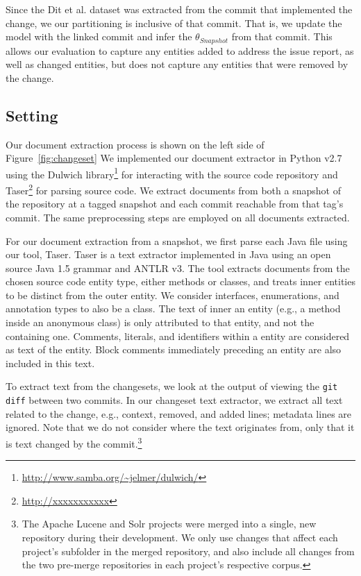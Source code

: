 Since the Dit et al. dataset was extracted from the commit that implemented the change,
we our partitioning is inclusive of that commit.
That is, we update the model with the linked commit and infer the
$\theta_{Snapshot}$ from that commit.
This allows our evaluation to capture any entities added to address the issue report,
as well as changed entities,
but does not capture any entities that were removed by the change.





\subsection{Setting}

Our document extraction process is shown on the left side of Figure~\ref{fig:changeset}
We implemented our document extractor in Python v2.7
using the Dulwich library\footnote{\url{http://www.samba.org/~jelmer/dulwich/}}
for interacting with the source code repository and
Taser\footnote{\url{http://xxxxxxxxxxx}} for parsing source code.
We extract documents from both a snapshot of the repository at a tagged
snapshot and each commit reachable from that tag's commit.
The same preprocessing steps are employed on all documents extracted.

For our document extraction from a snapshot, we first parse each Java file using our tool, Taser.
Taser is a text extractor implemented in Java using an open source Java 1.5 grammar and ANTLR v3.
The tool extracts documents from the chosen source code entity type,
either methods or classes, and treats inner entities to be distinct from the outer entity.
We consider interfaces, enumerations, and annotation types to also be a class.
The text of inner an entity (e.g., a method inside an anonymous class)
is only attributed to that entity, and not the containing one.
Comments, literals, and identifiers within a entity are considered as text of the entity.
Block comments immediately preceding an entity are also included in this text.

To extract text from the changesets, we look at the output of viewing
the \texttt{git diff} between two commits.
In our changeset text extractor, we extract all text related to the
change, e.g., context, removed, and added lines; metadata lines are ignored.
Note that we do not consider where the text originates from,
only that it is text changed by the commit.\footnote{
The Apache Lucene and Solr projects were merged into a single, new repository
during their development.
We only use changes that affect each project's subfolder in the merged repository,
and also include all changes from the two pre-merge repositories in each project's respective corpus.
}


